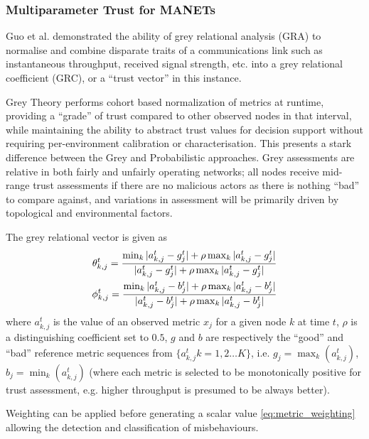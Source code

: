 \documentclass[conference]{IEEEtran}
\begin{document}
\subsubsection{Multiparameter Trust for MANETs}

Guo et al. \cite{Guo11} demonstrated the ability of grey relational analysis (GRA) \cite{Zuo1995} to normalise and combine disparate traits of a communications link such as instantaneous throughput, received signal strength, etc. into a grey relational coefficient (GRC), or a ``trust vector'' in this instance.

Grey Theory performs cohort based normalization of metrics at runtime, providing a ``grade'' of trust compared to other observed nodes in that interval, while maintaining the ability to abstract trust values for decision support without requiring per-environment calibration or characterisation.
This presents a stark difference between the Grey and Probabilistic approaches.
Grey assessments are relative in both fairly and unfairly operating networks; all nodes receive mid-range trust assessments if there are no malicious actors as there is nothing ``bad'' to compare against, and variations in assessment will be primarily driven by topological and environmental factors.

The grey relational vector is given as
%
\begin{align}
  \label{eq:grc}
  \theta_{k,j}^t = \frac{\min_k|a_{k,j}^t - g_j^t| + \rho \max_k|a_{k,j}^t-g_j^t|}{|a_{k,j}^t-g_j^t| + \rho \max_k|a_{k,j}^t-g_j^t|} \\
  \phi_{k,j}^t = \frac{\min_k|a_{k,j}^t - b_j^t| + \rho \max_k|a_{k,j}^t-b_j^t|}{|a_{k,j}^t-b_j^t| + \rho \max_k|a_{k,j}^t-b_j^t|} \notag 
\end{align}
%
where $a_{k,j}^t$ is the value of an observed metric $x_j$ for a given node $k$ at time $t$, $\rho$ is a distinguishing coefficient set to $0.5$, $g$ and $b$ are respectively the ``good'' and ``bad'' reference metric sequences from $\{a_{k,j}^t k=1,2\dots K\}$, i.e. $g_j=\max_k({a_{k,j}^t})$,  $b_j=\min_k({a_{k,j}^t})$ (where each metric is selected to be monotonically positive for trust assessment, e.g. higher throughput is presumed to be always better). 

Weighting can be applied before generating a scalar value \eqref{eq:metric_weighting} allowing the detection and classification of misbehaviours.
\end{document}
